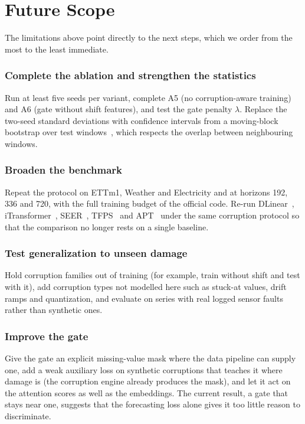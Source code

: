 \section{Future Scope}
\label{sec:future}

The limitations above point directly to the next steps, which we order from the most to the least immediate.

\subsubsection{Complete the ablation and strengthen the statistics}
Run at least five seeds per variant, complete A5 (no corruption-aware training) and A6 (gate without shift features), and test the gate penalty $\lambda$. Replace the two-seed standard deviations with confidence intervals from a moving-block bootstrap over test windows~\cite{kunsch}, which respects the overlap between neighbouring windows.

\subsubsection{Broaden the benchmark}
Repeat the protocol on ETTm1, Weather and Electricity and at horizons 192, 336 and 720, with the full training budget of the official code. Re-run DLinear~\cite{dlinear}, iTransformer~\cite{itransformer}, SEER~\cite{seer}, TFPS~\cite{tfps} and APT~\cite{apt} under the same corruption protocol so that the comparison no longer rests on a single baseline.

\subsubsection{Test generalization to unseen damage}
Hold corruption families out of training (for example, train without shift and test with it), add corruption types not modelled here such as stuck-at values, drift ramps and quantization, and evaluate on series with real logged sensor faults rather than synthetic ones.

\subsubsection{Improve the gate}
Give the gate an explicit missing-value mask where the data pipeline can supply one, add a weak auxiliary loss on synthetic corruptions that teaches it where damage is (the corruption engine already produces the mask), and let it act on the attention scores as well as the embeddings. The current result, a gate that stays near one, suggests that the forecasting loss alone gives it too little reason to discriminate.

